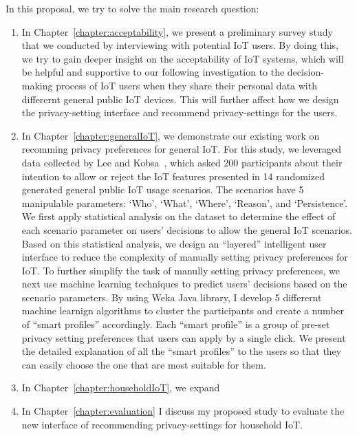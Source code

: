In this proposal, we try to solve the main research question:
\begin{enumerate}
	\item In Chapter~\ref{chapter:acceptability}, we present a preliminary survey study that we conducted by interviewing with potential IoT users. By doing this, we try to gain deeper insight on the acceptability of IoT systems, which will be helpful and supportive to our following investigation to the decision-making process of IoT users when they share their personal data with differernt general public IoT devices. This will further affect how we design the privacy-setting interface and recommend privacy-settings for the users.
	
	\item In Chapter~\ref{chapter:generalIoT}, we demonstrate our existing work on recomming privacy preferences for general IoT. For this study, we leveraged data collected by Lee and Kobsa~\cite{lee2016understanding}, which asked 200 participants about their intention to allow or reject the IoT features presented in 14 randomized generated general public IoT usage scenarios. The scenarios have 5 manipulable parameters: `Who', `What', `Where', `Reason', and `Persistence'. We first apply statistical analysis on the dataset to determine the effect of each scenario parameter on users' decisions to allow the general IoT scenarios. Based on this statistical analysis, we design an ``layered'' intelligent user interface to reduce the complexity of manually setting privacy preferences for IoT. To further simplify the task of manully setting privacy preferences, we next use machine learning techniques to predict users' decisions based on the scenario parameters. By using Weka Java library, I develop 5 differernt machine learnign algorithms to cluster the participants and create a number of ``smart profiles''  accordingly. Each ``smart profile'' is a group of pre-set privacy setting preferences that users can apply by a single click. We present the detailed explanation of all the ``smart profiles''  to the users so that they can easily choose the one that are most suitable for them.
	
	\item In Chapter~\ref{chapter:householdIoT}, we expand 
	
	\item In Chapter~\ref{chapter:evaluation} I discuss my proposed study to evaluate the new interface of recommending privacy-settings for household IoT.
\end{enumerate}







